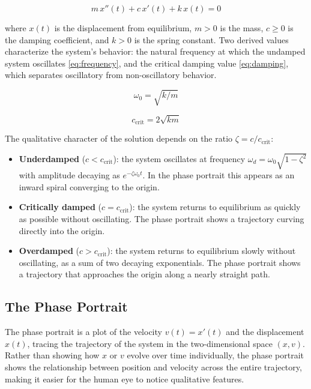 \documentclass[12pt]{article}
\begin{document}
\begin{equation}
    m\,x''(t) + c\,x'(t) + k\,x(t) = 0
    \label{eq:ode}
\end{equation}

where $x(t)$ is the displacement from equilibrium, $m > 0$ is the mass,
$c\ge0$ is the damping coefficient, and $k>0$ is the spring constant.
Two derived values characterize the system's behavior: the natural frequency at which the undamped system oscillates \eqref{eq:frequency}, and the critical damping value \eqref{eq:damping}, which separates oscillatory from non-oscillatory behavior. 

\begin{equation}
    \omega_0 = \sqrt{k/m} 
    \label{eq:frequency}
\end{equation}

\begin{equation}
    c_{\text{crit}} = 2\sqrt{km}
    \label{eq:damping}
\end{equation}

    
The qualitative character of the solution depends on the ratio
$\zeta = c / c_{\text{crit}}$:

\begin{itemize}
    \item \textbf{Underdamped} ($c < c_{\text{crit}}$): the system oscillates
          at frequency $\omega_d = \omega_0\sqrt{1-\zeta^2}$ with amplitude
          decaying as $e^{-\zeta\omega_0 t}$. In the phase portrait this
          appears as an inward spiral converging to the origin.
    \item \textbf{Critically damped} ($c = c_{\text{crit}}$): the system
          returns to equilibrium as quickly as possible without oscillating.
          The phase portrait shows a trajectory curving directly into the origin.
    \item \textbf{Overdamped} ($c > c_{\text{crit}}$): the system returns to
          equilibrium slowly without oscillating, as a sum of two decaying
          exponentials. The phase portrait shows a trajectory that approaches
          the origin along a nearly straight path.
\end{itemize}

\subsection{The Phase Portrait}

The phase portrait is a plot of the velocity $v(t) = x'(t)$ and the displacement $x(t)$, tracing the trajectory of the system in the two-dimensional space $(x, v)$. Rather than showing how $x$ or $v$ evolve over time individually, the phase portrait shows the relationship between 
position and velocity across the entire trajectory, making it easier for the human eye to notice qualitative features.
\end{document}
